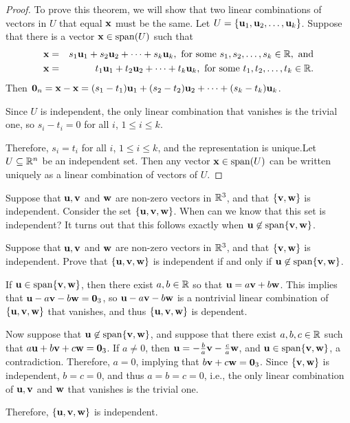 \begin{proof}
To prove this theorem, we will show that two linear combinations of vectors in $U$ that equal $\mbox{\bf x}$ must be the same. Let $U =\{\mbox{\bf u}_1, \mbox{\bf u}_2, \ldots, \mbox{\bf u}_k\}$.
Suppose that there is a vector $\vect{x}\in \sspan(U)$ such that
\begin{eqnarray*}
\mbox{\bf x} & = & s_1\mbox{\bf u}_1 + s_2\mbox{\bf u}_2 + \cdots + s_k\mbox{\bf u}_k,
\mbox{ for some } s_1, s_2, \ldots, s_k\in\mathbb{R}, \mbox{ and} \\
\mbox{\bf x} & = & t_1\mbox{\bf u}_1 + t_2\mbox{\bf u}_2 + \cdots + t_k\mbox{\bf u}_k,
\mbox{ for some } t_1, t_2, \ldots, t_k\in\mathbb{R}.
\end{eqnarray*}
Then 
$\mbox{\bf 0}_n=\mbox{\bf x}-\mbox{\bf x} = (s_1-t_1)\mbox{\bf u}_1 + (s_2-t_2)\mbox{\bf u}_2 + \cdots +
(s_k-t_k)\mbox{\bf u}_k$.

Since $U$ is independent, the only linear combination that vanishes
is the trivial one, so $s_i-t_i=0$ for all $i$, $1\leq i\leq k$.

Therefore, $s_i=t_i$ for all $i$, $1\leq i\leq k$, and the
representation is unique.Let $U \subseteq\mathbb{R}^n$ be an independent set.
Then any vector $\vect{x}\in\sspan(U)$ can be written uniquely as a linear combination of vectors of $U$.
\end{proof}

Suppose that $\mbox{\bf u},\mbox{\bf v}$ and $\mbox{\bf w}$ are non-zero vectors in $\mathbb{R}^3$,
and that $\{\mbox{\bf v},\mbox{\bf w}\}$ is independent. Consider the set $\{\mbox{\bf u},\mbox{\bf v},\mbox{\bf w}\}$. When can we know that this set is independent? It turns out that this follows exactly when $\vect{u}\not\in\sspan\{\vect{v},\vect{w}\}$.

\begin{example}{}{}
Suppose that $\mbox{\bf u},\mbox{\bf v}$ and $\mbox{\bf w}$ are non-zero vectors in $\mathbb{R}^3$,
and that $\{\mbox{\bf v},\mbox{\bf w}\}$ is independent.
Prove that $\{\mbox{\bf u},\mbox{\bf v},\mbox{\bf w}\}$ is independent if and only if 
$\vect{u}\not\in\sspan\{\vect{v},\vect{w}\}$.
\end{example}

\begin{solution}
If $\vect{u}\in\sspan\{\vect{v},\vect{w}\}$, then there exist $a,b\in\mathbb{R}$ so
that $\mbox{\bf u}=a\mbox{\bf v} + b\mbox{\bf w}$.
This implies that $\mbox{\bf u}-a\mbox{\bf v} - b\mbox{\bf w}=\mbox{\bf 0}_3$,
so  $\mbox{\bf u}-a\mbox{\bf v} - b\mbox{\bf w}$
is a nontrivial linear combination of $\{\mbox{\bf u},\mbox{\bf v},\mbox{\bf w}\}$ that
vanishes, 
and thus $\{\mbox{\bf u},\mbox{\bf v},\mbox{\bf w}\}$ is dependent.

Now suppose that $\vect{u}\not\in\sspan\{\vect{v},\vect{w}\}$, and suppose
that there exist $a,b,c\in\mathbb{R}$ such that
$a\mbox{\bf u}+b\mbox{\bf v}+c\mbox{\bf w}=\mbox{\bf 0}_3$.
If $a\neq 0$, then $\mbox{\bf u}=-\frac{b}{a}\mbox{\bf v}-\frac{c}{a}\mbox{\bf w}$,
and $\vect{u}\in\sspan\{\vect{v},\vect{w}\}$, a contradiction.
Therefore, $a=0$, implying that $b\mbox{\bf v}+c\mbox{\bf w}=\mbox{\bf 0}_3$.
Since $\{\mbox{\bf v},\mbox{\bf w}\}$ is independent, $b=c=0$, and thus
$a=b=c=0$, i.e., the only linear combination of 
$\mbox{\bf u},\mbox{\bf v}$ and $\mbox{\bf w}$ that vanishes is the trivial one.

Therefore, $\{\mbox{\bf u},\mbox{\bf v},\mbox{\bf w}\}$ is independent.
\end{solution}

